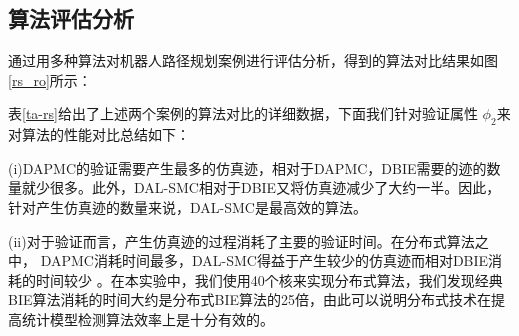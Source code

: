 \subsection{算法评估分析}
通过用多种算法对机器人路径规划案例进行评估分析，得到的算法对比结果如图 \ref{rs_ro}所示：
\begin{figure}[htbp]

\end{figure}

表\ref{ta-rs}给出了上述两个案例的算法对比的详细数据，下面我们针对验证属性 $\phi_2$来对算法的性能对比总结如下：

(i)DAPMC的验证需要产生最多的仿真迹，相对于DAPMC，DBIE需要的迹的数量就少很多。此外，DAL-SMC相对于DBIE又将仿真迹减少了大约一半。因此，针对产生仿真迹的数量来说，DAL-SMC是最高效的算法。

(ii)对于验证而言，产生仿真迹的过程消耗了主要的验证时间。在分布式算法之中， DAPMC消耗时间最多，DAL-SMC得益于产生较少的仿真迹而相对DBIE消耗的时间较少 。在本实验中，我们使用40个核来实现分布式算法，我们发现经典BIE算法消耗的时间大约是分布式BIE算法的25倍，由此可以说明分布式技术在提高统计模型检测算法效率上是十分有效的。

